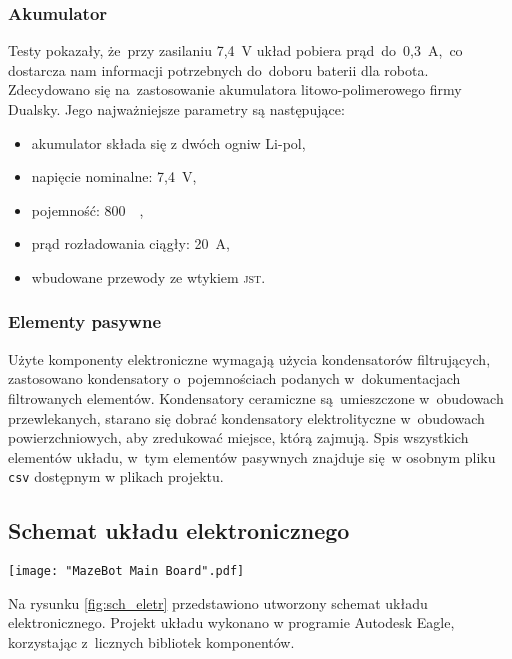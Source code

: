 \documentclass[11pt]{article}
\begin{document}
\subsubsection{Akumulator}
Testy pokazały, że~przy zasilaniu 7,4~\si{\volt} układ pobiera prąd~do~0,3~\si{\ampere},~co dostarcza nam informacji potrzebnych do~doboru baterii dla robota.
Zdecydowano się na~zastosowanie akumulatora litowo-polimerowego firmy Dualsky.
Jego najważniejsze parametry są następujące:
\begin{itemize}
	\item akumulator składa się z dwóch ogniw Li-pol,
	\item napięcie nominalne: 7,4~\si{\volt},
	\item pojemność: 800~\si{\milli\amperehour},
	\item prąd rozładowania ciągły: 20~\si{\ampere},
	\item wbudowane przewody ze wtykiem \textsc{jst}.
\end{itemize}

\subsubsection{Elementy pasywne}
Użyte komponenty elektroniczne wymagają użycia kondensatorów filtrujących, zastosowano kondensatory o~pojemnościach podanych w~dokumentacjach filtrowanych elementów.
Kondensatory ceramiczne są~umieszczone w~obudowach przewlekanych, starano się dobrać kondensatory elektrolityczne w~obudowach powierzchniowych, aby zredukować miejsce, którą zajmują.
Spis wszystkich elementów układu, w~tym elementów pasywnych znajduje się~w osobnym pliku \texttt{csv} dostępnym w plikach projektu. 
\subsection{Schemat układu elektronicznego}
\label{sec:schem}

\begin{sidewaysfigure}[!htbp]
		\centering
		\texttt{[image: "MazeBot Main Board".pdf]}
		\caption{Schemat układu elektronicznego}
		\label{fig:sch_eletr}
\end{sidewaysfigure}

Na rysunku \ref{fig:sch_eletr} przedstawiono utworzony schemat układu elektronicznego.
Projekt układu wykonano w programie Autodesk Eagle, korzystając z~licznych bibliotek komponentów. 
\end{document}
